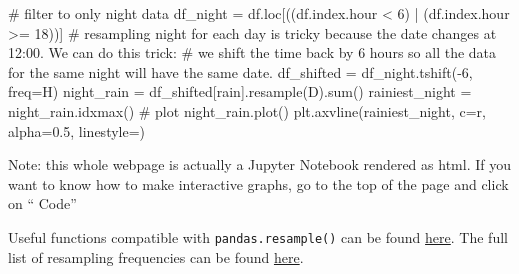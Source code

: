 \documentclass[
  letterpaper,
  DIV=11,
  numbers=noendperiod]{scrreprt}
\newenvironment{Shaded}{\begin{snugshade}}{\end{snugshade}}
\newcommand{\BuiltInTok}[1]{\textcolor[rgb]{0.00,0.23,0.31}{#1}}
\newcommand{\CommentTok}[1]{\textcolor[rgb]{0.37,0.37,0.37}{#1}}
\newcommand{\DecValTok}[1]{\textcolor[rgb]{0.68,0.00,0.00}{#1}}
\newcommand{\FloatTok}[1]{\textcolor[rgb]{0.68,0.00,0.00}{#1}}
\newcommand{\NormalTok}[1]{\textcolor[rgb]{0.00,0.23,0.31}{#1}}
\newcommand{\OperatorTok}[1]{\textcolor[rgb]{0.37,0.37,0.37}{#1}}
\newcommand{\StringTok}[1]{\textcolor[rgb]{0.13,0.47,0.30}{#1}}
\begin{document}
\begin{tcolorbox}
\begin{Shaded}
\begin{Highlighting}[]
\CommentTok{\# filter to only night data}
\NormalTok{df\_night }\OperatorTok{=}\NormalTok{ df.loc[((df.index.hour }\OperatorTok{\textless{}} \DecValTok{6}\NormalTok{) }\OperatorTok{|}\NormalTok{ (df.index.hour }\OperatorTok{\textgreater{}=} \DecValTok{18}\NormalTok{))]}
\CommentTok{\# resampling night for each day is tricky because the date changes at 12:00. We can do this trick:}
\CommentTok{\# we shift the time back by 6 hours so all the data for the same night will have the same date.}
\NormalTok{df\_shifted }\OperatorTok{=}\NormalTok{ df\_night.tshift(}\OperatorTok{{-}}\DecValTok{6}\NormalTok{, freq}\OperatorTok{=}\StringTok{\textquotesingle{}H\textquotesingle{}}\NormalTok{)}
\NormalTok{night\_rain }\OperatorTok{=}\NormalTok{ df\_shifted[}\StringTok{\textquotesingle{}rain\textquotesingle{}}\NormalTok{].resample(}\StringTok{\textquotesingle{}D\textquotesingle{}}\NormalTok{).}\BuiltInTok{sum}\NormalTok{()}
\NormalTok{rainiest\_night }\OperatorTok{=}\NormalTok{ night\_rain.idxmax()}
\CommentTok{\# plot}
\NormalTok{night\_rain.plot()}
\NormalTok{plt.axvline(rainiest\_night, c}\OperatorTok{=}\StringTok{\textquotesingle{}r\textquotesingle{}}\NormalTok{, alpha}\OperatorTok{=}\FloatTok{0.5}\NormalTok{, linestyle}\OperatorTok{=}\StringTok{\textquotesingle{}{-}{-}\textquotesingle{}}\NormalTok{)}
\end{Highlighting}
\end{Shaded}

\end{tcolorbox}

Note: this whole webpage is actually a Jupyter Notebook rendered as
html. If you want to know how to make interactive graphs, go to the top
of the page and click on `` Code''

Useful functions compatible with \texttt{pandas.resample()} can be found
\href{https://pandas.pydata.org/docs/reference/resampling.html\#computations-descriptive-stats}{here}.
The full list of resampling frequencies can be found
\href{https://pandas.pydata.org/pandas-docs/version/0.12.0/timeseries.html\#offset-aliases}{here}.
\end{document}
